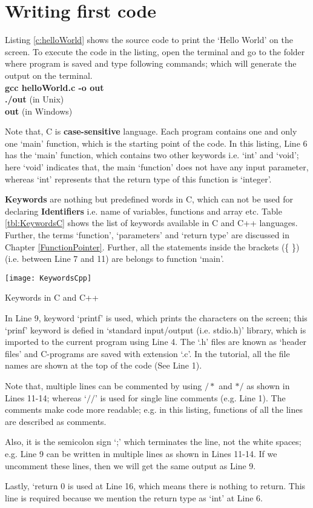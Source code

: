 \section{Writing first code}
 Listing \ref{c:helloWorld} shows the source code to print the `Hello World' on the screen. To execute the code in the listing, open the terminal and go to the folder where program is saved and type following commands; which will generate the output on the terminal. 
\\
\textbf{\textdollar { \ } gcc helloWorld.c -o out} \\
\textbf{\textdollar { \ }  ./out} (in Unix)\\
\textbf{\textdollar { \ }  out} (in Windows)\\

\begin{explanation}
	Note that, C is \textbf{case-sensitive} language. Each program contains one and only one  `main' function, which is the starting point of the code. In this listing, Line 6 has the `main' function, which contains two other keywords i.e. `int' and `void'; here `void' indicates that, the main `function' does not have any input parameter, whereas `int' represents that the return type of this function is `integer'. 
	
	\textbf{Keywords} are nothing but predefined words in C, which can not be used for declaring \textbf{Identifiers} i.e. name of variables, functions and array etc. Table \ref{tbl:KeywordsC} shows the list of keywords available in C and C++ languages. Further, the terms `function', `parameters' and `return type' are discussed in Chapter \ref{FunctionPointer}. Further, all the statements inside the brackets (\{ \}) (i.e. between Line 7 and 11) are belongs to function `main'. 
	
	\begin{table}
		\centering
		\texttt{[image: KeywordsCpp]}
		\caption{Keywords in C and C++}
		\label{tbl:KeywordsC}
	\end{table}
	
	In Line 9, keyword `printf' is used, which prints the characters on the screen; this `prinf' keyword is defied in `standard input/output (i.e. stdio.h)' library, which is imported to the current program using Line 4. The `.h' files are known as `header files' and C-programs are saved with extension `.c'. In the tutorial, all the file names are shown at the top of the code (See Line 1). 
	
	Note that,  multiple lines can be commented by using $/ *$ and $* /$ as shown in Lines 11-14; whereas `$//$' is used for single line comments (e.g. Line 1). The comments make code more readable; e.g. in this listing, functions of all the lines are described as comments.

	Also, it is the semicolon sign `;' which terminates the line, not the white spaces; e.g. Line 9 can be written in multiple lines as shown in Lines 11-14. If we uncomment these lines, then we will get the same output as Line 9. 
	
	Lastly, `return 0 is used at Line 16, which means there is nothing to return. This line is required because we mention the return type as `int' at Line 6. 
\end{explanation}
